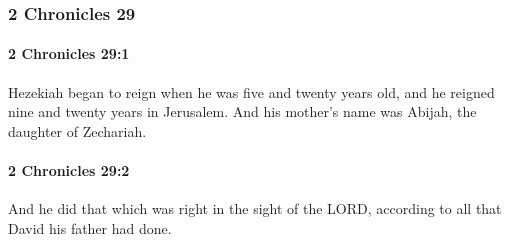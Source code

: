 	\subsubsection{2 Chronicles 29} %
		\label{2CHRONICLES-29}

		\paragraph{2 Chronicles 29:1} %
			\label{2CHRONICLES-29-1}

			Hezekiah began to reign when he was five and twenty years old, and he reigned nine and twenty years in Jerusalem. And his mother's name was Abijah, the daughter of Zechariah.


		\paragraph{2 Chronicles 29:2} %
			\label{2CHRONICLES-29-2}

			And he did that which was right in the sight of the LORD, according to all that David his father had done.

